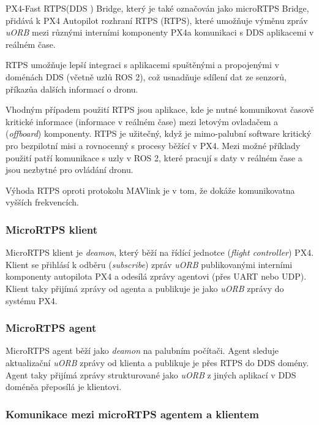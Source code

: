 PX4-Fast RTPS(\acs{DDS} ) Bridge, který je také označován jako microRTPS Bridge, přidává k PX4 Autopilot rozhraní \acs{RTPS} (\acl{RTPS}), které umožňuje výměnu zpráv \textit{uORB} mezi různými interními komponenty PX4\break a  komunikaci s \acs{DDS} aplikacemi v reálném čase.

\acs{RTPS} umožňuje lepší integraci s aplikacemi spuštěnými a propojenými v doménách \acs{DDS} (včetně uzlů ROS 2), což usnadňuje sdílení dat ze senzorů, příkazů\break a dalších informací o dronu.

Vhodným případem použití \acs{RTPS} jsou aplikace, kde je nutné komunikovat časově kritické informace (informace v reálném čase) mezi letovým ovladačem a  (\textit{offboard}) komponenty. \acs{RTPS} je užitečný, když je mimo-palubní software kritický pro bezpilotní misi a rovnocenný s procesy běžící v PX4. Mezi možné příklady použití patří komunikace s uzly v ROS 2, které pracují s daty v reálném čase a jsou nezbytné pro ovládání dronu.

Výhoda \acs{RTPS} oproti protokolu MAVlink je v tom, že dokáže komunikovat\break na vyšších frekvencích. \cite{PX4docs}

\subsubsection{MicroRTPS klient}

MicroRTPS klient je \textit{deamon}, který běží na řídící jednotce (\textit{flight controller}) PX4. Klient se přihlásí k odběru (\textit{subscribe}) zpráv \textit{uORB} publikovanými interními komponenty autopilota PX4 a odesílá zprávy agentovi (přes UART nebo UDP). Klient taky přijímá zprávy od agenta a publikuje je jako \textit{uORB} zprávy do systému PX4.

\subsubsection{MicroRTPS agent}

MicroRTPS agent běží jako \textit{deamon} na palubním počítači. Agent sleduje aktualizační \textit{uORB} zprávy od klienta a publikuje je přes \acs{RTPS} do \acs{DDS} domény. Agent taky přijímá zprávy strukturované jako \textit{uORB} z jiných aplikací v \acs{DDS} doméně\break a přeposílá je klientovi.

\subsubsection{Komunikace mezi microRTPS agentem a klientem}

